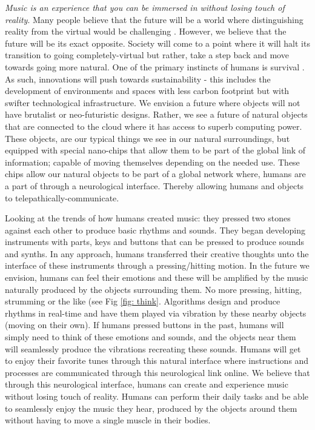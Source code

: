 \documentclass[acmtog]{acmart}
\begin{document}
\textit{Music is an experience that you can be immersed in without losing touch of reality}. Many people believe that the future will be a world where distinguishing reality from the virtual would be challenging \cite{tamura2001mixed}. However, we believe that the future will be its exact opposite. Society will come to a point where it will halt its transition to going completely-virtual but rather, take a step back and move towards going more natural. One of the primary instincts of humans is survival \cite{khantzian1983self}. As such, innovations will push towards sustainability - this includes the development of environments and spaces with less carbon footprint but with swifter technological infrastructure. We envision a future where objects will not have brutalist or neo-futuristic designs. Rather, we see a future of natural objects that are connected to the cloud where it has access to superb computing power. These objects, are our typical things we see in our natural surroundings, but equipped with special nano-chips that allow them to be part of the global link of information; capable of moving themselves depending on the needed use. These chips allow our natural objects to be part of a global network where, humans are a part of through a neurological interface. Thereby allowing humans and objects to telepathically-communicate. 

Looking at the trends of how humans created music:  they pressed two stones against each other to produce basic rhythms and sounds. They began developing instruments with parts, keys and buttons that can be pressed to produce sounds and synths. In any approach, humans transferred their creative thoughts unto the interface of these instruments through a pressing/hitting motion. In the future we envision, humans can feel their emotions and these will be amplified by the music naturally produced by the objects surrounding them. No more pressing, hitting, strumming or the like (see Fig \ref{fig: think}. Algorithms design and produce rhythms in real-time and have them played via vibration by these nearby objects (moving on their own). If humans pressed buttons in the past, humans will simply need to think of these emotions and sounds, and the objects near them will seamlessly produce the vibrations recreating these sounds. Humans will get to enjoy their favorite tunes through this natural interface where instructions and processes are communicated through this neurological link online. We believe that through this neurological interface, humans can create and experience music without losing touch of reality. Humans can perform their daily tasks and be able to seamlessly enjoy the music they hear, produced by the objects around them without having to move a single muscle in their bodies. 
\end{document}
